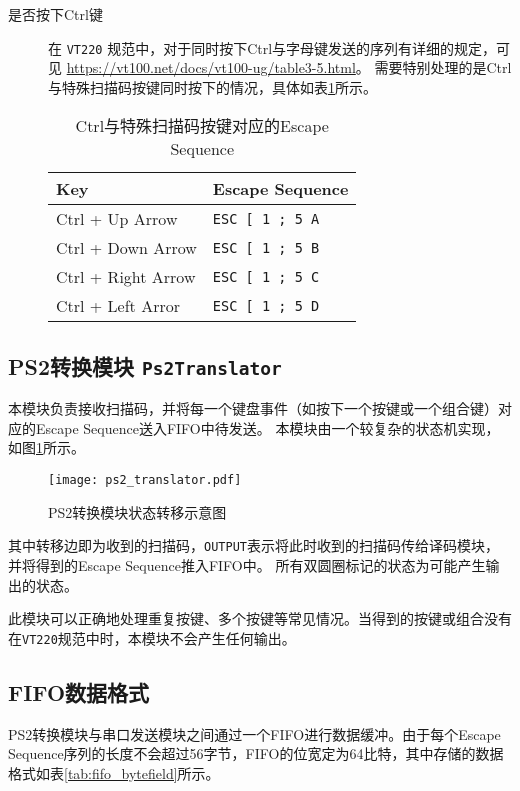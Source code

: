 \begin{description}
    \item[是否按下Ctrl键] 在 \texttt{VT220} 规范中，对于同时按下Ctrl与字母键发送的序列有详细的规定，可见 \url{https://vt100.net/docs/vt100-ug/table3-5.html}。
    需要特别处理的是Ctrl与特殊扫描码按键同时按下的情况，具体如表\ref{tab:ctrl_scancode}所示。

    \begin{table}[htbp]
        \centering
        \caption{Ctrl与特殊扫描码按键对应的Escape Sequence}
        \label{tab:ctrl_scancode}
        \begin{tabular}{|l|l|}
        \hline
        \textbf{Key}           & \textbf{Escape Sequence}  \\ \hline
        Ctrl + Up Arrow        & \texttt{ESC {[} 1 ; 5 A}  \\ \hline
        Ctrl + Down Arrow      & \texttt{ESC {[} 1 ; 5 B}  \\ \hline
        Ctrl + Right Arrow     & \texttt{ESC {[} 1 ; 5 C}  \\ \hline
        Ctrl + Left Arror      & \texttt{ESC {[} 1 ; 5 D}  \\ \hline
        \end{tabular}
    \end{table}
 \end{description}

 \subsection{PS2转换模块 \texttt{Ps2Translator}}
 本模块负责接收扫描码，并将每一个键盘事件（如按下一个按键或一个组合键）对应的Escape Sequence送入FIFO中待发送。
 本模块由一个较复杂的状态机实现，如图\ref{fig:ps2_translator}所示。

 \begin{figure}[htbp]
    \centering
    \texttt{[image: ps2\_translator.pdf]}
    \caption{PS2转换模块状态转移示意图}
    \label{fig:ps2_translator}
\end{figure}

其中转移边即为收到的扫描码，\texttt{OUTPUT}表示将此时收到的扫描码传给译码模块，并将得到的Escape Sequence推入FIFO中。
所有双圆圈标记的状态为可能产生输出的状态。

此模块可以正确地处理重复按键、多个按键等常见情况。当得到的按键或组合没有在\texttt{VT220}规范中时，本模块不会产生任何输出。

\subsection{FIFO数据格式}
PS2转换模块与串口发送模块之间通过一个FIFO进行数据缓冲。由于每个Escape Sequence序列的长度不会超过56字节，FIFO的位宽定为64比特，其中存储的数据格式如表\ref{tab:fifo_bytefield}所示。

